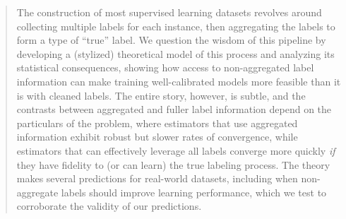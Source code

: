 
\begin{abstract}
  The construction of most supervised learning datasets revolves around
  collecting multiple labels for each instance, then aggregating the labels
  to form a type of ``true'' label.
  We question the wisdom of this pipeline by developing a (stylized)
  theoretical model of this process and analyzing its statistical
  consequences, showing how access to non-aggregated label information can
  make training well-calibrated models more feasible than it is with
  cleaned labels.
  The entire story, however, is subtle, and the
  contrasts between aggregated and fuller label information depend on
  the particulars of the problem,
  where estimators that use aggregated information exhibit robust but slower
  rates of convergence, while estimators that can effectively
  leverage all labels converge more quickly \emph{if} they have
  fidelity to (or can learn) the true labeling process.
  The theory
  makes several predictions for real-world datasets, including when
  non-aggregate labels should improve learning performance, which we
  test to corroborate the validity of our predictions.
\end{abstract}
